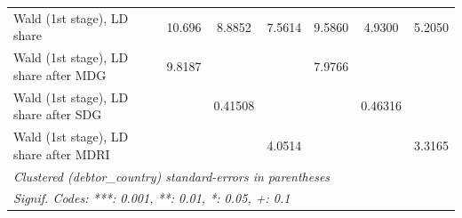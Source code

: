\begin{table}[htbp]
\begin{tabular}{lcccccc}
      Wald (1st stage), LD share            & 10.696    & 8.8852    & 7.5614    & 9.5860   & 4.9300   & 5.2050\\  
      Wald (1st stage), LD share after MDG  & 9.8187    &           &           & 7.9766   &          & \\  
      Wald (1st stage), LD share after SDG  &           & 0.41508   &           &          & 0.46316  & \\  
      Wald (1st stage), LD share after MDRI &           &           & 4.0514    &          &          & 3.3165\\  
      \midrule \midrule
      \multicolumn{7}{l}{\emph{Clustered (debtor\_country) standard-errors in parentheses}}\\
      \multicolumn{7}{l}{\emph{Signif. Codes: ***: 0.001, **: 0.01, *: 0.05, +: 0.1}}\\
   \end{tabular}
\end{table}


